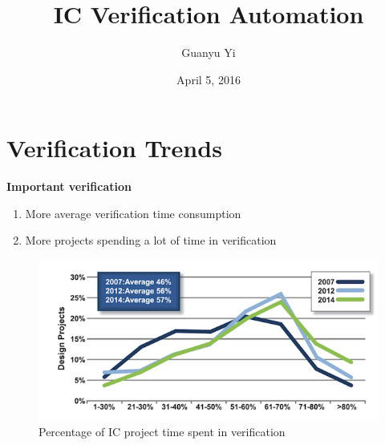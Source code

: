 \documentclass{beamer}
\title[IC Verification Automation]{IC Verification Automation} %
\author{Guanyu Yi} %
\institute[cmos] %
{
  \medskip
  \textit{gary3511@gmail.com} %
}
\date{April 5, 2016} %
\begin{document}
\begin{frame}
  \titlepage %
\end{frame}

\begin{frame}
  \tableofcontents %
\end{frame}


\section{Verification Trends} %


\begin{frame}

  \textbf{Important verification}
  \begin{enumerate}
  \item More average verification time consumption
  \item More projects spending a lot of time in verification
  \end{enumerate}
  \begin{figure}
    \centering
    \includegraphics[width=0.9\linewidth]{wilson1}
    \caption{Percentage of IC project time spent in verification}
  \end{figure}

\end{frame}
\end{document}
